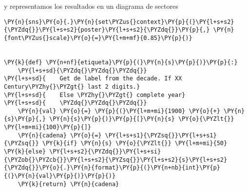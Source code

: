    y representamos los resultados en un diagrama de sectores

    \begin{tcolorbox}[breakable, size=fbox, boxrule=1pt, pad at break*=1mm,colback=cellbackground, colframe=cellborder]
\begin{Verbatim}[commandchars=\\\{\}]
\PY{n}{sns}\PY{o}{.}\PY{n}{set\PYZus{}context}\PY{p}{(}\PY{l+s+s2}{\PYZdq{}}\PY{l+s+s2}{poster}\PY{l+s+s2}{\PYZdq{}}\PY{p}{,} \PY{n}{font\PYZus{}scale}\PY{o}{=}\PY{l+m+mf}{0.85}\PY{p}{)}


\PY{k}{def} \PY{n+nf}{etiqueta}\PY{p}{(}\PY{n}{s}\PY{p}{)}\PY{p}{:}
    \PY{l+s+sd}{\PYZdq{}\PYZdq{}\PYZdq{}}
\PY{l+s+sd}{    Get de label from the decade. If XX Century\PYZhy{}\PYZgt{} last 2 digits.}
\PY{l+s+sd}{    Else \PYZhy{}\PYZgt{} complete year}
\PY{l+s+sd}{    \PYZdq{}\PYZdq{}\PYZdq{}}
    \PY{n}{val} \PY{o}{=} \PY{p}{(}\PY{l+m+mi}{1900} \PY{o}{+} \PY{n}{s}\PY{p}{,} \PY{n}{s}\PY{p}{)}\PY{p}{[}\PY{n}{s} \PY{o}{\PYZlt{}} \PY{l+m+mi}{100}\PY{p}{]}
    \PY{n}{cadena} \PY{o}{=} \PY{l+s+s1}{\PYZsq{}}\PY{l+s+s1}{\PYZsq{}} \PY{k}{if} \PY{n}{s} \PY{o}{\PYZlt{}} \PY{l+m+mi}{50} \PY{k}{else} \PY{l+s+s2}{\PYZdq{}}\PY{l+s+si}{\PYZob{}\PYZcb{}}\PY{l+s+s2}{\PYZsq{}}\PY{l+s+s2}{s}\PY{l+s+s2}{\PYZdq{}}\PY{o}{.}\PY{n}{format}\PY{p}{(}\PY{n+nb}{int}\PY{p}{(}\PY{n}{val}\PY{p}{)}\PY{p}{)}
    \PY{k}{return} \PY{n}{cadena}


\end{Verbatim}
\end{tcolorbox}
